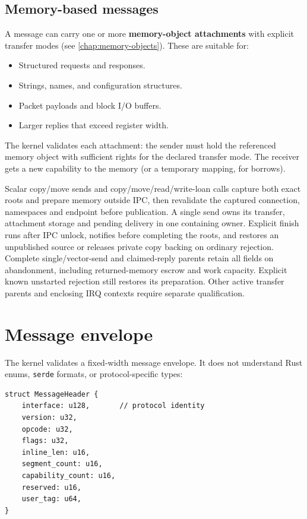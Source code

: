 \subsection{Memory-based messages}

A message can carry one or more \textbf{memory-object attachments} with explicit
transfer modes (see \autoref{chap:memory-objects}). These are suitable for:

\begin{itemize}
    \item Structured requests and responses.
    \item Strings, names, and configuration structures.
    \item Packet payloads and block I/O buffers.
    \item Larger replies that exceed register width.
\end{itemize}

The kernel validates each attachment: the sender must hold the referenced memory
object with sufficient rights for the declared transfer mode. The receiver gets a
new capability to the memory (or a temporary mapping, for borrows).

Scalar copy/move sends and copy/move/read/write-loan calls capture both exact
roots and prepare memory outside IPC, then revalidate the captured connection,
namespaces and endpoint before publication. A single send owns its transfer,
attachment storage and pending delivery in one containing owner. Explicit finish
runs after IPC unlock, notifies before completing the roots, and restores an
unpublished source or releases private copy backing on ordinary rejection.
Complete single/vector-send and claimed-reply parents retain all fields on
abandonment, including returned-memory escrow and work capacity. Explicit known
unstarted rejection still restores its preparation. Other active transfer
parents and enclosing IRQ contexts require separate qualification.

\section{Message envelope}

The kernel validates a fixed-width message envelope. It does not understand Rust
enums, \texttt{serde} formats, or protocol-specific types:

\begin{lstlisting}[style=rustCode]
struct MessageHeader {
    interface: u128,       // protocol identity
    version: u32,
    opcode: u32,
    flags: u32,
    inline_len: u16,
    segment_count: u16,
    capability_count: u16,
    reserved: u16,
    user_tag: u64,
}
\end{lstlisting}

